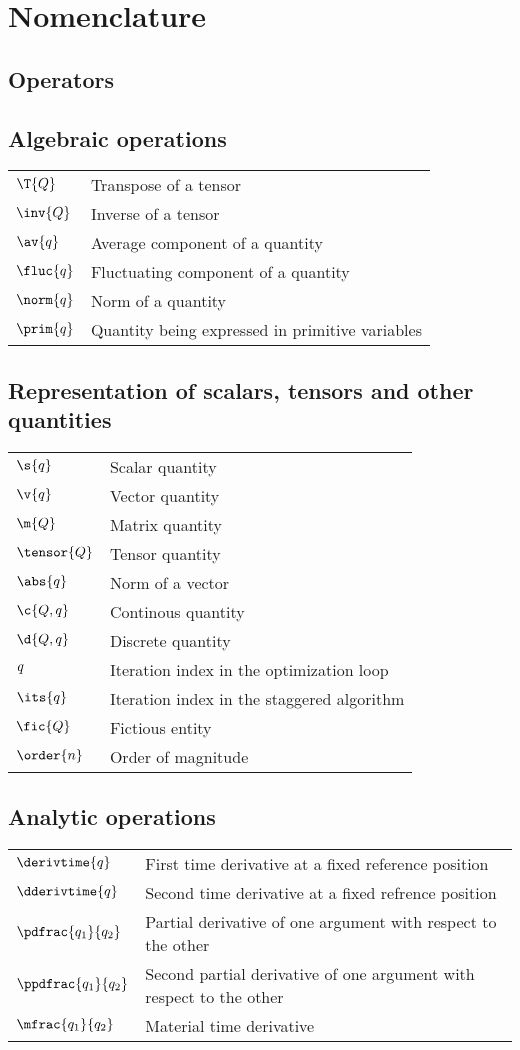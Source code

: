 \section*{Nomenclature}\label{sec:nomenclature}

\subsection*{Operators}

\subsection*{Algebraic operations}
\begin{tabular}{l l}
$\T{Q}$ & Transpose of a tensor\\
$\inv{Q}$ & Inverse of a tensor\\
$\av{q}$ & Average component of a quantity\\
$\fluc{q}$ & Fluctuating component of a quantity\\
$\norm{q}$ & Norm of a quantity\\
$\prim{q}$ & Quantity being expressed in primitive variables
\end{tabular}

\subsection*{Representation of scalars, tensors and other quantities}
\begin{tabular}{l l}
$\s{q}$ & Scalar quantity\\
$\v{q}$ & Vector quantity\\
$\m{Q}$ & Matrix quantity\\
$\tensor{Q}$ & Tensor quantity\\
$\abs{q}$ & Norm of a vector\\
$\c{Q,q}$ & Continous quantity\\
$\d{Q,q}$ & Discrete quantity\\
$\it{q}$ & Iteration index in the optimization loop\\
$\its{q}$ & Iteration index in the staggered algorithm\\
$\fic{Q}$ & Fictious entity\\
$\order{n}$ & Order of magnitude
\end{tabular}

\subsection*{Analytic operations}
\begin{tabular}{l l}
$\derivtime{q}$ & First time derivative at a fixed reference position\\
$\dderivtime{q}$ & Second time derivative at a fixed refrence position\\
$\pdfrac{q_1}{q_2}$ & Partial derivative of one argument with respect to the other\\
$\ppdfrac{q_1}{q_2}$ & Second partial derivative of one argument with respect to the other\\
$\mfrac{q_1}{q_2}$ & Material time derivative
\end{tabular}

